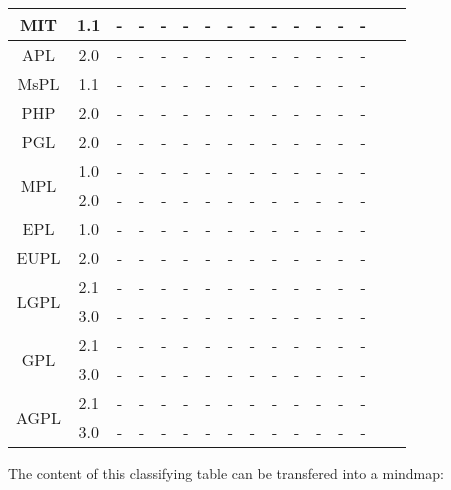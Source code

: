 \begin{table}
\begin{center}
\begin{tabular}{|c|c|c|c|c|c|c|c|c|c|c|c|c|c|c|c|}
\hline
MIT & 1.1 & - & - & - & - & - & - & - & - & - & - & - & - \\
\hline
APL & 2.0 & - & - & - & - & - & - & - & - & - & - & - & - \\
\hline
MsPL & 1.1 & - & - & - & - & - & - & - & - & - & - & - & - \\
\hline
PHP & 2.0 & - & - & - & - & - & - & - & - & - & - & - & - \\
\hline
PGL & 2.0 & - & - & - & - & - & - & - & - & - & - & - & - \\
\hline
\hline
\multirow{2}{*}{MPL} & 1.0 & - & - & - & - & - & - & - & - & - & - & - & - \\
\cline{2-14}
 & 2.0 & - & - & - & - & - & - & - & - & - & - & - & - \\
\hline
EPL & 1.0 & - & - & - & - & - & - & - & - & - & - & - & - \\
\hline
EUPL & 2.0 & - & - & - & - & - & - & - & - & - & - & - & - \\
\hline
\multirow{2}{*}{LGPL} & 2.1 & - & - & - & - & - & - & - & - & - & - & - & - \\
\cline{2-14}
 & 3.0 & - & - & - & - & - & - & - & - & - & - & - & - \\
\hline
\hline
\multirow{2}{*}{GPL} & 2.1 & - & - & - & - & - & - & - & - & - & - & - & - \\
\cline{2-14}
 & 3.0 & - & - & - & - & - & - & - & - & - & - & - & - \\
\hline
\multirow{2}{*}{AGPL} & 2.1 & - & - & - & - & - & - & - & - & - & - & - & - \\
\cline{2-14}
 & 3.0 & - & - & - & - & - & - & - & - & - & - & - & - \\
\hline
\hline

\end{tabular}
\end{center}
\end{table}




The content of this classifying table can be transfered into a mindmap:


